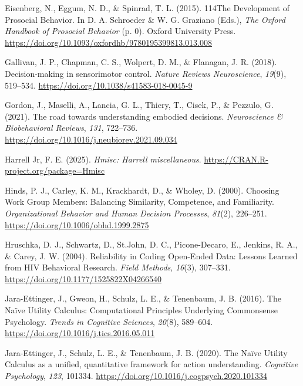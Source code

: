 \documentclass[
  man,
  floatsintext,
  longtable,
  nolmodern,
  notxfonts,
  notimes,
  mask,
  colorlinks=true,linkcolor=blue,citecolor=blue,urlcolor=blue]{apa7}
\newlength{\cslhangindent}
\newenvironment{CSLReferences}[2] %
 {\begin{list}{}{%
  \setlength{\itemindent}{0pt}
  \setlength{\leftmargin}{0pt}
  \setlength{\parsep}{0pt}
  \ifodd #1
   \setlength{\leftmargin}{\cslhangindent}
   \setlength{\itemindent}{-1\cslhangindent}
  \fi
  \setlength{\itemsep}{#2\baselineskip}}}
 {\end{list}}
\begin{document}
\begin{CSLReferences}{1}{0}
Eisenberg, N., Eggum, N. D., \& Spinrad, T. L. (2015). {114The
Development} of {Prosocial Behavior}. In D. A. Schroeder \& W. G.
Graziano (Eds.), \emph{The {Oxford Handbook} of {Prosocial Behavior}}
(p. 0). Oxford University Press.
\url{https://doi.org/10.1093/oxfordhb/9780195399813.013.008}

Gallivan, J. P., Chapman, C. S., Wolpert, D. M., \& Flanagan, J. R.
(2018). Decision-making in sensorimotor control. \emph{Nature Reviews
Neuroscience}, \emph{19}(9), 519--534.
\url{https://doi.org/10.1038/s41583-018-0045-9}

Gordon, J., Maselli, A., Lancia, G. L., Thiery, T., Cisek, P., \&
Pezzulo, G. (2021). The road towards understanding embodied decisions.
\emph{Neuroscience \& Biobehavioral Reviews}, \emph{131}, 722--736.
\url{https://doi.org/10.1016/j.neubiorev.2021.09.034}

Harrell Jr, F. E. (2025). \emph{{Hmisc}: Harrell miscellaneous}.
\url{https://CRAN.R-project.org/package=Hmisc}

Hinds, P. J., Carley, K. M., Krackhardt, D., \& Wholey, D. (2000).
Choosing {Work Group Members}: {Balancing Similarity}, {Competence}, and
{Familiarity}. \emph{Organizational Behavior and Human Decision
Processes}, \emph{81}(2), 226--251.
\url{https://doi.org/10.1006/obhd.1999.2875}

Hruschka, D. J., Schwartz, D., St.John, D. C., Picone-Decaro, E.,
Jenkins, R. A., \& Carey, J. W. (2004). Reliability in {Coding
Open-Ended Data}: {Lessons Learned} from {HIV Behavioral Research}.
\emph{Field Methods}, \emph{16}(3), 307--331.
\url{https://doi.org/10.1177/1525822X04266540}

Jara-Ettinger, J., Gweon, H., Schulz, L. E., \& Tenenbaum, J. B. (2016).
The {Na{ï}ve Utility Calculus}: {Computational Principles Underlying
Commonsense Psychology}. \emph{Trends in Cognitive Sciences},
\emph{20}(8), 589--604. \url{https://doi.org/10.1016/j.tics.2016.05.011}

Jara-Ettinger, J., Schulz, L. E., \& Tenenbaum, J. B. (2020). The
{Na{ï}ve Utility Calculus} as a unified, quantitative framework for
action understanding. \emph{Cognitive Psychology}, \emph{123}, 101334.
\url{https://doi.org/10.1016/j.cogpsych.2020.101334}


\end{CSLReferences}
\end{document}
